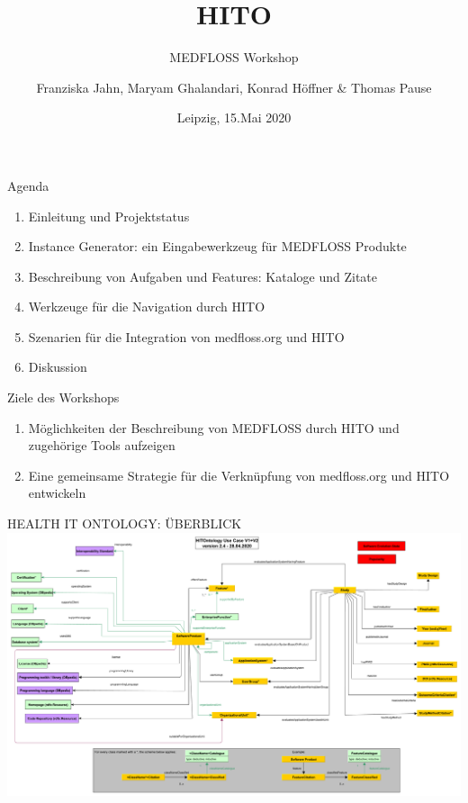 \documentclass[aspectratio=1610,12pt]{beamer}
\author{Franziska Jahn, Maryam Ghalandari, Konrad Höffner \& Thomas Pause}
\date{Leipzig, 15.Mai 2020}
\title{HITO}
\subtitle{MEDFLOSS Workshop}
\begin{document}
\begin{frame}
\titlepage
\end{frame}

\begin{frame}{Agenda}
\begin{spacing}{1.25}
\begin{enumerate}
\item Einleitung und Projektstatus
\item Instance Generator: ein Eingabewerkzeug für MEDFLOSS Produkte
\item Beschreibung von Aufgaben und Features: Kataloge und Zitate
\item Werkzeuge für die Navigation durch HITO
\item Szenarien für die Integration von medfloss.org und HITO
\item Diskussion
\end{enumerate}
\end{spacing}
\end{frame}

\begin{frame}{Ziele des Workshops}
\begin{spacing}{1.5}
  \begin{enumerate}
    \item Möglichkeiten der Beschreibung von MEDFLOSS durch HITO und zugehörige Tools aufzeigen
    \item Eine gemeinsame Strategie für die Verknüpfung von medfloss.org und HITO entwickeln
  \end{enumerate}
\end{spacing}
\end{frame}


\begin{frame}{HEALTH IT ONTOLOGY: ÜBERBLICK}
\centering
\includegraphics[width=.95\textwidth]{img/HITontology.pdf}
\end{frame}
\end{document}
